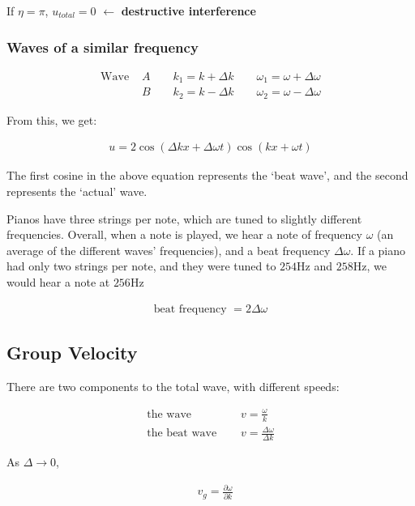 \documentclass[10pt,a4paper]{article}
\begin{document}
If $\eta = \pi$, $u_{total} = 0$ $\leftarrow$ \textbf{destructive interference}

\subsubsection*{Waves of a similar frequency}

\begin{align*}
\text{Wave } & A \quad\quad k_1 = k + \Delta k \quad\quad \omega_1 = \omega + \Delta \omega \\
& B \quad\quad k_2 = k - \Delta k \quad\quad \omega_2 = \omega - \Delta \omega
\end{align*}

From this, we get:

\begin{align*}
u = 2 \cos(\Delta k x + \Delta \omega t) \cos(kx + \omega t)
\end{align*}

The first cosine in the above equation represents the `beat wave', and the second represents the `actual' wave.

Pianos have three strings per note, which are tuned to slightly different frequencies. Overall, when a note is played, we hear a note of frequency $\omega$ (an average of the different waves' frequencies), and a beat frequency $\Delta \omega$. If a piano had only two strings per note, and they were tuned to $254 \mathrm{Hz}$ and $258 \mathrm{Hz}$, we would hear a note at $256 \mathrm{Hz}$

\begin{align*}
\text{beat frequency } = 2 \Delta \omega
\end{align*}

\subsection*{Group Velocity}

There are two components to the total wave, with different speeds:

\begin{align*}
\text{the wave } \quad & v = \frac{\omega}{k} \\
\text{the beat wave } \quad & v = \frac{\Delta \omega}{\Delta k}
\end{align*}

As $\Delta \rightarrow 0$,

\begin{align*}
& v_g = \frac{\partial \omega}{\partial k}
\end{align*}
\end{document}
